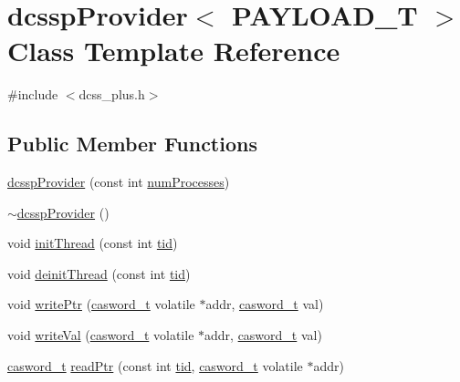 \hypertarget{classdcsspProvider}{}\section{dcssp\+Provider$<$ P\+A\+Y\+L\+O\+A\+D\+\_\+T $>$ Class Template Reference}
\label{classdcsspProvider}


{\ttfamily \#include $<$dcss\+\_\+plus.\+h$>$}

\subsection*{Public Member Functions}
\begin{DoxyCompactItemize}
\item 
\hyperlink{classdcsspProvider_aba58711c0d9ea054185f1ce2403fbfd8}{dcssp\+Provider} (const int \hyperlink{testing_8cpp_aa085812188e21ede75351d88b9b2c30d}{num\+Processes})
\item 
\hyperlink{classdcsspProvider_adfef25cec973ae89775db7cb00865b15}{$\sim$dcssp\+Provider} ()
\item 
void \hyperlink{classdcsspProvider_aa6bd49afcdbc6175d3f2ae125a37e568}{init\+Thread} (const int \hyperlink{microbench_2main_8cpp_a9ca9869868fe7e7a38a921cc7de4103f}{tid})
\item 
void \hyperlink{classdcsspProvider_afa6aefab56ad81937a7d9c9220e5c534}{deinit\+Thread} (const int \hyperlink{microbench_2main_8cpp_a9ca9869868fe7e7a38a921cc7de4103f}{tid})
\item 
void \hyperlink{classdcsspProvider_ae915e5f5824576fc6cde8cf81bea4980}{write\+Ptr} (\hyperlink{rq__unsafe_8h_ad45142aaf2ff20a036dc6242b8483e9c}{casword\+\_\+t} volatile $\ast$addr, \hyperlink{rq__unsafe_8h_ad45142aaf2ff20a036dc6242b8483e9c}{casword\+\_\+t} val)
\item 
void \hyperlink{classdcsspProvider_a7f2905e08fe20ca166fabc0c81ed28e4}{write\+Val} (\hyperlink{rq__unsafe_8h_ad45142aaf2ff20a036dc6242b8483e9c}{casword\+\_\+t} volatile $\ast$addr, \hyperlink{rq__unsafe_8h_ad45142aaf2ff20a036dc6242b8483e9c}{casword\+\_\+t} val)
\item 
\hyperlink{rq__unsafe_8h_ad45142aaf2ff20a036dc6242b8483e9c}{casword\+\_\+t} \hyperlink{classdcsspProvider_a05815f2c3c9d57e21e04ba4343ef8b2c}{read\+Ptr} (const int \hyperlink{microbench_2main_8cpp_a9ca9869868fe7e7a38a921cc7de4103f}{tid}, \hyperlink{rq__unsafe_8h_ad45142aaf2ff20a036dc6242b8483e9c}{casword\+\_\+t} volatile $\ast$addr)
\item 

\end{DoxyCompactItemize}
